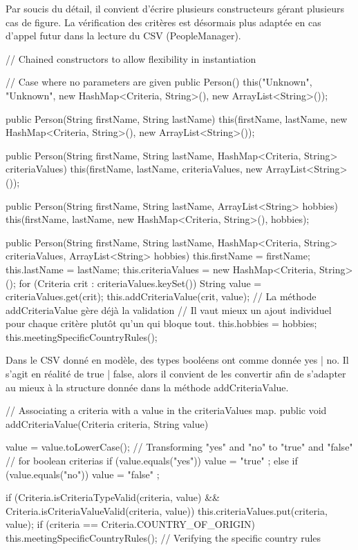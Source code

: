 \documentclass{mytex}
\begin{document}

Par soucis du détail, il convient d'écrire plusieurs constructeurs gérant plusieurs cas de figure.
La vérification des critères est désormais plus adaptée en cas d'appel futur dans la lecture du CSV (PeopleManager).

\begin{codebox}
// Chained constructors to allow flexibility in instantiation

// Case where no parameters are given
public Person() {
	this("Unknown", "Unknown", new HashMap<Criteria, String>(), new ArrayList<String>());
}

public Person(String firstName, String lastName) {
	this(firstName, lastName, new HashMap<Criteria, String>(), new ArrayList<String>());
}

public Person(String firstName, String lastName, HashMap<Criteria, String> criteriaValues) {
	this(firstName, lastName, criteriaValues, new ArrayList<String>());
}

public Person(String firstName, String lastName, ArrayList<String> hobbies) {
	this(firstName, lastName, new HashMap<Criteria, String>(), hobbies);
}

public Person(String firstName, String lastName, HashMap<Criteria, String> criteriaValues, ArrayList<String> hobbies) {
	this.firstName = firstName;
	this.lastName = lastName;
	this.criteriaValues = new HashMap<Criteria, String>();
	for (Criteria crit : criteriaValues.keySet()) {
		String value = criteriaValues.get(crit);
		this.addCriteriaValue(crit, value);
		// La méthode addCriteriaValue gère déjà la validation
		// Il vaut mieux un ajout individuel pour chaque critère plutôt qu'un qui bloque tout.
	}
	this.hobbies = hobbies;
	this.meetingSpecificCountryRules();
}
\end{codebox}


Dans le CSV donné en modèle, des types booléens ont comme donnée yes | no. Il s'agit en réalité de true | false, alors il convient de les convertir afin de s'adapter au mieux à la structure donnée dans la méthode addCriteriaValue.

\begin{codebox}
// Associating a criteria with a value in the criteriaValues map.
public void addCriteriaValue(Criteria criteria, String value) {
	value = value.toLowerCase();
	// Transforming "yes" and "no" to "true" and "false"
	// for boolean criterias
	if (value.equals("yes")) value = "true" ;
	else if (value.equals("no")) value = "false" ;
	
	if (Criteria.isCriteriaTypeValid(criteria, value) && Criteria.isCriteriaValueValid(criteria, value)) {
		this.criteriaValues.put(criteria, value);
	}
	if (criteria == Criteria.COUNTRY_OF_ORIGIN) {
		this.meetingSpecificCountryRules(); // Verifying the specific country rules
	}
}
\end{codebox}
\end{document}
